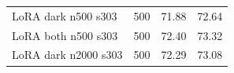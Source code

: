 \begin{table}[htbp]
\begin{tabular}{lrrr}
LoRA dark n500 s303 & %
500 & %
71.88 & %
72.64 \\ %

LoRA both n500 s303 & %
500 & %
72.40 & %
73.32 \\ %

LoRA dark n2000 s303 & %
500 & %
72.29 & %
73.08 \\ %


\end{tabular}
\end{table}
